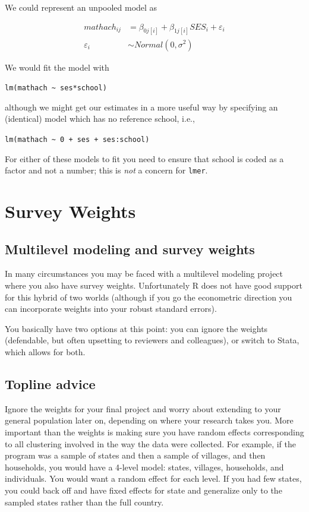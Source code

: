 \documentclass[
  letterpaper,
  DIV=11,
  numbers=noendperiod]{scrreprt}
\begin{document}
We could represent an unpooled model as

\[\begin{aligned}
    mathach_{ij} &= \beta_{0j[i]} + \beta_{1j[i]}SES_i + \varepsilon_i \\
    \varepsilon_i &\sim Normal(0, \sigma^2)
\end{aligned}\]

We would fit the model with

\texttt{lm(mathach\ \textasciitilde{}\ ses*school)}

although we might get our estimates in a more useful way by specifying
an (identical) model which has no reference school, i.e.,

\texttt{lm(mathach\ \textasciitilde{}\ 0\ +\ ses\ +\ ses:school)}

For either of these models to fit you need to ensure that school is
coded as a factor and not a number; this is \emph{not} a concern for
\texttt{lmer}.

\hypertarget{survey-weights}{%
\chapter{Survey Weights}\label{survey-weights}}

\hypertarget{multilevel-modeling-and-survey-weights}{%
\section{Multilevel modeling and survey
weights}\label{multilevel-modeling-and-survey-weights}}

In many circumstances you may be faced with a multilevel modeling
project where you also have survey weights. Unfortunately R does not
have good support for this hybrid of two worlds (although if you go the
econometric direction you can incorporate weights into your robust
standard errors).

You basically have two options at this point: you can ignore the weights
(defendable, but often upsetting to reviewers and colleagues), or switch
to Stata, which allows for both.

\hypertarget{topline-advice}{%
\section{Topline advice}\label{topline-advice}}

Ignore the weights for your final project and worry about extending to
your general population later on, depending on where your research takes
you. More important than the weights is making sure you have random
effects corresponding to all clustering involved in the way the data
were collected. For example, if the program was a sample of states and
then a sample of villages, and then households, you would have a 4-level
model: states, villages, households, and individuals. You would want a
random effect for each level. If you had few states, you could back off
and have fixed effects for state and generalize only to the sampled
states rather than the full country.
\end{document}
